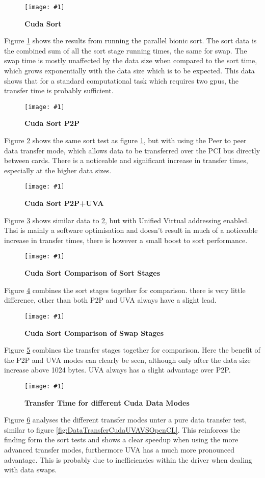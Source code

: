 \documentclass[12pt,a4paper]{article}
\newcommand{\figuremacroWHHN}[3]{
	\begin{figure}[H] %
		\centering
		\texttt{[image: \#1]}
		\caption[#2]{\textbf{#2}}
		\label{fig:#1}
	\end{figure}
}
\begin{document}
\figuremacroWHHN
{TeslaCudaSortStandard}
{Cuda Sort}
{1.0}

Figure \ref{fig:TeslaCudaSortStandard} shows the results from running the parallel bionic sort. The sort data is the combined sum of all the sort stage running times, the same for swap. 
The swap time is mostly unaffected by the data size when compared to the sort time, which grows exponentially with the data size which is to be expected. 
This data shows that for a standard computational task which requires two gpus, the transfer time is probably sufficient. 

\figuremacroWHHN
{TeslaCudaSortP2P}
{Cuda Sort P2P}
{1.0}
\clearpage
Figure \ref{fig:TeslaCudaSortP2P} shows the same sort test as figure \ref{fig:TeslaCudaSortStandard}, but with using the Peer to peer data transfer mode, which allows data to be transferred over the PCI bus directly between cards.
There is a noticeable and significant increase in transfer times, especially at the higher data sizes.

\figuremacroWHHN
{TeslaCudaSortP2PUVA}
{Cuda Sort P2P+UVA}
{1.0}

Figure \ref{fig:TeslaCudaSortP2PUVA} shows similar data to  \ref{fig:TeslaCudaSortP2P}, but with Unified Virtual addressing enabled. Thsi is mainly a software optimisation and doesn't result in much of a noticeable increase in transfer times, there is however a small boost to sort performance.
\clearpage

\figuremacroWHHN
{TeslaCudaSortSortStages}
{Cuda Sort Comparison of Sort Stages}
{1.0}

Figure \ref{fig:TeslaCudaSortSortStages} combines the sort stages together for comparison. there is very little difference, other than both P2P and UVA always have a slight lead.

\figuremacroWHHN
{TeslaCudaSortSwapStages}
{Cuda Sort Comparison of Swap Stages}
{1.0}

Figure \ref{fig:TeslaCudaSortSwapStages} combines the transfer stages together for comparison. Here the benefit of the P2P and UVA modes can clearly be seen, although only after the data size increase above 1024 bytes.
UVA always has a slight advantage over P2P.

\figuremacroWHHN
{CUDADataTransfer}
{Transfer Time for different Cuda Data Modes}
{1.0}

Figure \ref{fig:CUDADataTransfer} analyses the different transfer modes unter a pure data transfer test, similar to figure \ref{fig:DataTransferCudaUVAVSOpenCL}. This reinforces the finding form the sort tests and shows a clear speedup when using the more advanced transfer modes, furthermore UVA has a much more pronounced advantage. This is probably due to inefficiencies within the driver when dealing with data swaps.
\end{document}
